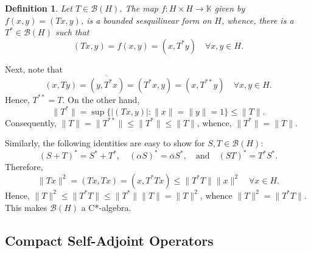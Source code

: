 \documentclass[11pt]{article}
\theoremstyle{thmstyle}
\theoremstyle{defstyle}
\newtheorem{definition}[theorem]{Definition}
\newcommand{\R}{\mathbb{R}}
\newcommand{\bbC}{\mathbb{C}}
\newcommand{\K}{\mathbb{K}} %
\newcommand{\scrB}{\mathscr B}
\renewcommand{\le}{\leqslant}
\begin{document}
\begin{definition}
    Let $T\in\scrB(H)$. The map $f: H\times H\to\K$ given by $f(x, y) = (Tx, y)$, is a bounded sesquilinear form on $H$, whence, there is a $T^\ast\in\scrB(H)$ such that 
    \begin{equation*}
        (Tx, y) = f(x, y) = (x, T^\ast y)\quad\forall x,y\in H.
    \end{equation*}
\end{definition}
Next, note that 
\begin{equation*}
    (x, Ty) = \overline{(y, T^\ast x)} = (T^\ast x, y) = (x, T^{\ast\ast}y)\quad\forall x, y\in H.
\end{equation*}
Hence, $T^{\ast\ast} = T$. On the other hand, 
\begin{equation*}
    \|T^\ast\| = \sup\{|(Tx, y)|\colon \|x\| = \|y\| = 1\}\le \|T\|.
\end{equation*}
Consequently, $\|T\| = \|T^{\ast\ast}\|\le\|T^{\ast}\|\le\|T\|$, whence, $\|T^\ast\| = \|T\|$.

Similarly, the following identities are easy to show for $S,T\in\scrB(H)$: 
\begin{equation*}
    (S + T)^\ast = S^\ast + T^\ast,\quad(\alpha S)^\ast = \overline\alpha S^\ast,\quad\text{and}\quad (ST)^\ast = T^\ast S^\ast.
\end{equation*}
Therefore, 
\begin{equation*}
    \|Tx\|^2 = (Tx, Tx) = (x, T^\ast Tx)\le \|T^\ast T\|\|x\|^2\quad\forall x\in H.
\end{equation*}
Hence, $\|T\|^2\le \|T^\ast T\|\le \|T^\ast\|\|T\| = \|T\|^2$, whence $\|T\|^2 = \|T^\ast T\|$. This makes $\scrB(H)$ a C*-algebra.

\subsection{Compact Self-Adjoint Operators}
\end{document}
